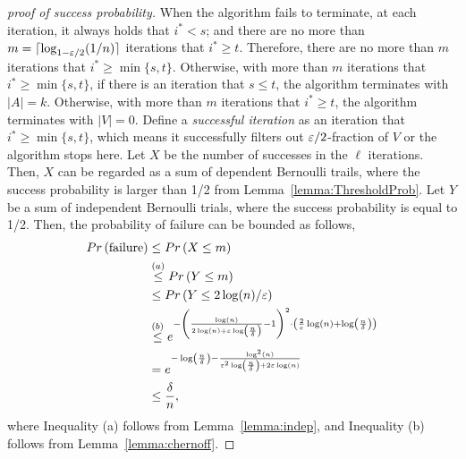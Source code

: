 \begin{proof}[proof of success probability]
    When the algorithm fails to terminate, at each iteration,
	it always holds that $i^* < s$;
	and there are no more than $m=\lceil\log_{1-\varepsilon/2}(1/n) \rceil$ 
	iterations that $i^* \ge t$.
	Therefore, there are no more than $m$ iterations that
	$i^* \ge \min\{s,t\}$.
	Otherwise, with more than $m$ iterations that
	$i^* \ge \min\{s,t\}$, 
	if there is an iteration that
	$s \le t$, the algorithm terminates with $|A| = k$.
	Otherwise, with more than $m$ iterations that 
	$i^* \ge t$, the algorithm terminates with $|V| = 0$.
	Define a \textit{successful iteration} as an iteration that
	$i^* \ge \min\{s,t\}$, which means it successfully filters out 
	$\varepsilon/2$-fraction of $V$ or the algorithm stops here.
	Let $X$ be the number of successes in the $\ell$ iterations.
	Then, $X$ can be regarded as a sum of dependent Bernoulli trails,
	where the success probability is larger than 1/2 
	from Lemma~\ref{lemma:ThresholdProb}.
	Let $Y$ be a sum of independent Bernoulli trials,
	where the success probability is equal to 1/2.
	Then, the probability of failure can be bounded as follows,
	\begin{align*} 
		Pr \left( \text{failure} \right) &\le Pr \left( X \le m \right) \\
        &\overset{(a)}{\le} Pr \left( Y \le m \right) \\
        &\le Pr \left( Y \le 2\log(n)/\varepsilon \right)\\ 
        &\overset{(b)}{\le} e^{-\left(\frac{\log(n)}{2\log(n)+
        \varepsilon \log\left(\frac{n}{\delta}\right)}-1\right)^2
        \cdot \left(\frac{2}{\varepsilon}\log(n)+\log\left(\frac{n}{\delta}\right)\right)}\\ 
        &=e^{-\log\left(\frac{n}{\delta}\right)-
        \frac{\log^2(n)}{\varepsilon^2 \log\left(\frac{n}{\delta}\right) 
        +2\varepsilon \log(n)}}\\
        & \le \frac{\delta}{n},
	\end{align*}
	where Inequality (a) follows from Lemma~\ref{lemma:indep},
	and Inequality (b) follows from Lemma~\ref{lemma:chernoff}.
\end{proof}

